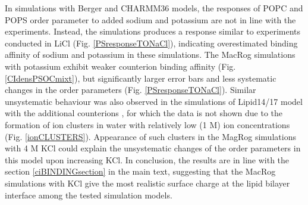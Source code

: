 \documentclass[journal=jpcbfk]{achemso}
\begin{document}
In simulations with Berger and CHARMM36 models, the responses of POPC and POPS order parameter
to added sodium and potassium are not in line with the experiments. Instead, the simulations produces a response similar to experiments conducted in LiCl (Fig. \ref{PSresponseTONaCl}), indicating overestimated binding affinity of sodium and potassium 
in these simulations. The MacRog simulations with potassium exhibit weaker counterion binding affinity
(Fig. \ref{CIdensPSOCmixt}), but significantly larger error bars and
less systematic changes in the order parameters (Fig. \ref{PSresponseTONaCl}).
Similar unsystematic behaviour was also observed in the simulations of Lipid14/17 model
with the additional counterions \cite{POPCpopsLIPID17withKCI,POPCpopsLIPID17withK,POPCpopsLIPID17withNaCI,POPCpopsLIPID17withNa},
for which the data is not shown due to the formation of
ion clusters in water with relatively low (1 M) ion concentrations (Fig. \ref{ionCLUSTERS}).
Appearance of such clusters in the MagRog simulations with 4 M KCl
could explain the unsystematic changes of the order parameters in this model upon increasing KCl.
In conclusion, the results are in line with the section \ref{ciBINDINGsection}
in the main text, suggesting that the MacRog simulations with KCl give the most
realistic surface charge at the lipid bilayer interface among the tested simulation models.
\end{document}
